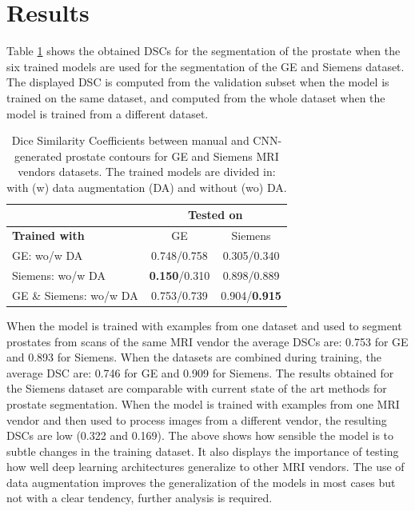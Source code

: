 \section{Results}

Table \ref{tab:res_prost} shows the obtained DSCs for the segmentation of the prostate when the six trained models are used for the segmentation of the GE and Siemens dataset.  The displayed DSC is computed from the validation subset when the model is trained on the same dataset, and computed from the whole dataset when the model is trained from a different dataset. 
\begin{table}[h]
    \centering
    \begin{tabular}{|l|c|c|}
         \hline
          & \multicolumn{2}{c|}{ \textbf{Tested on} } \\
         \hline
          \textbf{Trained with} &  GE & Siemens  \\
         \hline
         GE: wo/w DA & 0.748/0.758 & 0.305/0.340 \\
         \hline
         Siemens: wo/w DA & \textbf{0.150}/0.310 & 0.898/0.889\\
         \hline
         GE \& Siemens: wo/w DA & 0.753/0.739 & 0.904/\textbf{0.915}\\
         \hline
    \end{tabular}
    \caption{Dice Similarity Coefficients between manual and CNN-generated prostate contours for GE and Siemens MRI vendors datasets. The trained models are divided in: with (w) data augmentation (DA) and without (wo) DA.}
    \label{tab:res_prost}
\end{table}
When the model is trained with examples from one dataset and used to segment prostates from scans of the same MRI vendor the average DSCs are: 0.753 for GE and 0.893 for Siemens. When the datasets are combined during training, the average DSC are: 0.746 for GE and 0.909 for Siemens.  The results obtained for the Siemens dataset are comparable with current state of the art methods for prostate segmentation. When the model is trained with examples from one MRI vendor and then used to process images from a different vendor, the resulting DSCs are low (0.322 and 0.169).  %
The above shows how sensible the model is to subtle changes in the training dataset. It also displays the importance of testing how well deep learning architectures generalize to other MRI vendors.  The use of data augmentation improves the generalization of the models in most cases but not with a clear tendency, further analysis is required.

